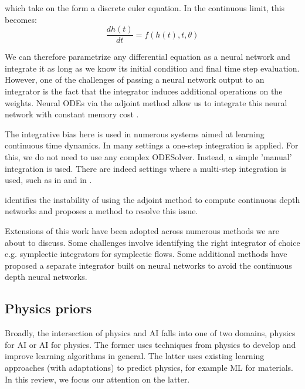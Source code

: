 \documentclass{article}
\begin{document}
which take on the form a discrete euler equation. In the continuous limit, this becomes:
\begin{equation}
\frac{dh(t)}{dt} = f(h(t),t,\theta)
\end{equation}

We can therefore parametrize any differential equation as a neural network and integrate it as long as we know its initial condition and final time step evaluation. However, one of the challenges of passing a neural network output to an integrator is the fact that the integrator induces additional operations on the weights. Neural ODEs via the adjoint method allow us to integrate this neural network with constant memory cost \cite{chen_neural_2018}.

The integrative bias here is used in numerous systems aimed at learning continuous time dynamics. In many settings a one-step integration is applied. For this, we do not need to use any complex ODESolver. Instead, a simple 'manual' integration is used. There are indeed settings where a multi-step integration is used, such as in \cite{zhong_symplectic_2019} and in \cite{saemundsson_variational_2019}.

\cite{dupont_augmented_2019} identifies the instability of using the adjoint method to compute continuous depth networks and proposes a method to resolve this issue. 

Extensions of this work have been adopted across numerous methods we are about to discuss. Some challenges involve identifying the right integrator of choice e.g. symplectic integrators for symplectic flows. Some additional methods have proposed a separate integrator built on neural networks to avoid the continuous depth neural networks.

\subsection{Physics priors}

Broadly, the intersection of physics and AI falls into one of two domains, physics for AI or AI for physics. The former uses techniques from physics to develop and improve learning algorithms in general. The latter uses existing learning approaches (with adaptations) to predict physics, for example ML for materials. In this review, we focus our attention on the latter.
\end{document}
